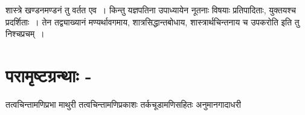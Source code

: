 {शास्त्रे खण्डनमण्डनं तु वर्तत एव~। किन्तु यज्ञपतिना उपाध्यायेन नूतनाः विषयाः प्रतिपादिताः, युक्तयश्च  प्रदर्शिताः~। तेन तद्व्याख्यानं मण्यर्थावगमाय, शात्रसिद्धान्तबोधाय, शास्त्रार्थचिन्तनाय च उपकरोति इति तु निश्चप्रचम्~। 

\section*{परामृष्टग्रन्थाः -}

\begin{thebibliography}{99}
 तत्वचिन्तामणिप्रभा 
 माथुरी 
 तत्वचिन्तामणिप्रकाशः तर्कचूडामणिसहितः
 अनुमानगादाधरी
\end{thebibliography}

\articleend
}
